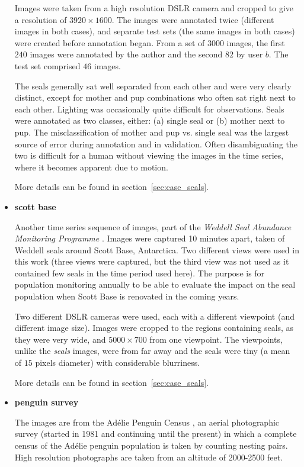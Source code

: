 \begin{itemize}
Images were taken from a high resolution DSLR camera and cropped to give a resolution of $3920\times1600$. The images were annotated twice (different images in both cases), and separate test sets (the same images in both cases) were  created before annotation began. From a set of $3000$ images, the first $240$ images were annotated by the author and the second $82$ by user $b$. The test set comprised $46$ images.

The seals generally sat well separated from each other and were very clearly distinct, except for mother and pup combinations who often sat right next to each other. Lighting was occasionally quite difficult for observations. Seals were annotated as two classes, either: (a) single seal or (b) mother next to pup.  The misclassification of mother and pup vs. single seal was the largest source of error during annotation and in validation. Often disambiguating the two is difficult for a human without viewing the images in the time series, where it becomes apparent due to motion.

More details can be found in section~\ref{sec:case_seals}.

    \item{\bf{scott base}}
    
Another time series sequence of images, part of the \emph{Weddell Seal Abundance Monitoring Programme} \cite{Eisert2019}. Images were captured 10 minutes apart, taken of Weddell seals around Scott Base, Antarctica. Two different views were used in this work (three views were captured, but the third view was not used as it contained few seals in the time period used here). The purpose is for population monitoring annually to be able to evaluate the impact on the seal population when Scott Base is renovated in the coming years. 

Two different DSLR cameras were used, each with a different viewpoint (and different image size). Images were cropped to the regions containing seals, as they were very wide, and $5000\times700$ from one viewpoint. The viewpoints, unlike the \emph{seals} images, were from far away and the seals were tiny (a mean of $15$ pixels diameter) with considerable blurriness.  
    
More details can be found in section~\ref{sec:case_seals}.
    
    \item{\bf{penguin survey}}
    
The images are from the Ad\'elie Penguin Census \cite{Lyver2014}, an aerial photographic survey (started in 1981 and continuing until the present) in which a complete census of the Ad\'elie penguin population is taken by counting nesting pairs. High resolution photographs are taken from an altitude of 2000-2500 feet.


\end{itemize}
